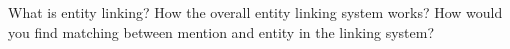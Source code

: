 What is entity linking? How the overall entity linking system works? How would you find matching between mention and entity in the linking system?

